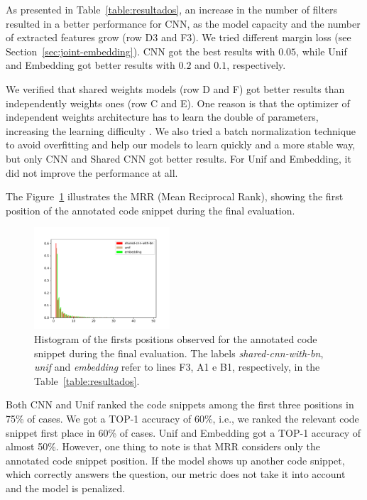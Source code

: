 \documentclass[sigconf]{acmart}
\begin{document}
As presented in Table~\ref{table:resultados}, an increase in the number of filters resulted in a better performance for CNN, as the model capacity and the number of extracted features grow (row D3 and F3). 
We tried different margin loss (see Section~\ref{sec:joint-embedding}). CNN got the best results with  $0.05$, while Unif and Embedding got better results with $0.2$ and $0.1$, respectively. 

We verified that shared weights models (row D and F) got better results than independently weights ones (row C and E). One reason is that the optimizer of independent weights architecture has to learn the double of parameters, increasing the learning difficulty \cite{feng-2015}. We also tried a batch normalization technique to avoid overfitting and help our models to learn quickly and a more stable way, but only CNN and Shared CNN got better results. For Unif and Embedding, it did not improve the performance at all. 

The Figure~\ref{fig:histogram-mrr} illustrates the MRR (Mean Reciprocal Rank), showing the first position of the annotated code snippet during the final evaluation.

\begin{figure}[h]
    \centering
    \includegraphics[width=0.45\textwidth]{figuras/histogram.pdf}
    \caption{Histogram of the firsts positions observed for the annotated code snippet during the final evaluation. The labels \emph{shared-cnn-with-bn}, \emph{unif} and \emph{embedding} refer to lines F3, A1 e B1, respectively, in the Table~\ref{table:resultados}.}
    \label{fig:histogram-mrr}
\end{figure}

Both CNN and Unif ranked the code snippets among the first three positions in 75\% of cases. We got a TOP-1 accuracy of 60\%, i.e., we ranked the relevant code snippet first place in 60\% of cases. Unif and Embedding got a TOP-1 accuracy of almost 50\%. However, one thing to note is that MRR considers only the annotated code snippet position. If the model shows up another code snippet, which correctly answers the question, our metric does not take it into account and the model is penalized. 
\end{document}
